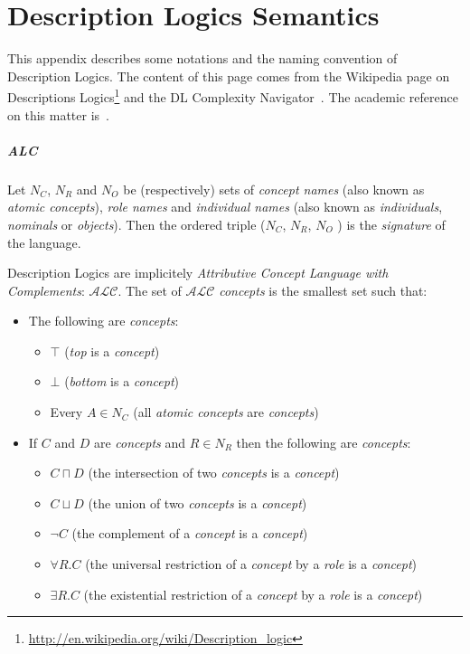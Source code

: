 \chapter{Description Logics Semantics}
\label{chapt|dl}

This appendix describes some notations and the naming convention of Description
Logics. The content of this page comes from the Wikipedia page on Descriptions
Logics\footnote{\url{http://en.wikipedia.org/wiki/Description_logic}} and the
DL Complexity Navigator~\cite{ZolinDLComplexityNavigator}. The academic reference
on this matter is~\cite{Baader2008}.


\paragraph{ALC} Let $N_C$, $N_R$ and $N_O$  be (respectively) sets of \emph{concept names}
(also known as \emph{atomic concepts}), \emph{role names} and \emph{individual
names} (also known as \emph{individuals}, \emph{nominals} or \emph{objects}).
Then the ordered triple ($N_C$, $N_R$, $N_O$ ) is the \emph{signature} of the
language.

Description Logics are implicitely \emph{Attributive Concept Language with
Complements}: $\mathcal{ALC}$.  The set of $\mathcal{ALC}$ \emph{concepts} is
the smallest set such that:

\begin{itemize}
    \item The following are \emph{concepts}:
    \begin{itemize}
        \item $\top$ (\emph{top} is a \emph{concept})
        \item $\bot$ (\emph{bottom} is a \emph{concept})
        \item Every $A \in N_C$ (all \emph{atomic concepts} are \emph{concepts})
    \end{itemize}

\item If $C$ and $D$ are \emph{concepts} and $R \in N_R$ then the following are \emph{concepts}:
        \begin{itemize}
            \item $C\sqcap D$ (the intersection of two \emph{concepts} is a \emph{concept})
            \item $C\sqcup D$ (the union of two \emph{concepts} is a \emph{concept})
            \item $\neg C$ (the complement of a \emph{concept} is a \emph{concept})
            \item $\forall R.C$ (the universal restriction of a \emph{concept} by a \emph{role} is a \emph{concept})
            \item $\exists R.C$ (the existential restriction of a \emph{concept} by a \emph{role} is a \emph{concept})
        \end{itemize}

\end{itemize}


